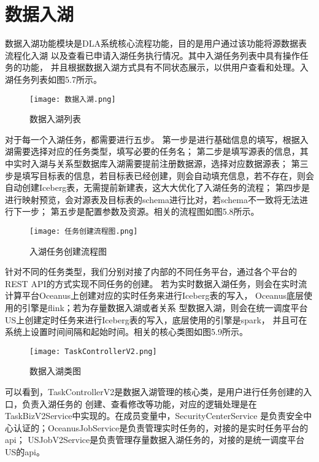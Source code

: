 \section{数据入湖}

数据入湖功能模块是DLA系统核心流程功能，目的是用户通过该功能将源数据表流程化入湖
以及查看已申请入湖任务执行情况。其中入湖任务列表中具有操作任务的功能，
并且根据数据入湖方式具有不同状态展示，以供用户查看和处理。入湖任务列表如图5.7所示。

\begin{figure}[h]
  \centering
  \texttt{[image: 数据入湖.png]}
  \caption{数据入湖列表}
  \label{fig:badge}
\end{figure}

对于每一个入湖任务，都需要进行五步。
第一步是进行基础信息的填写，根据入湖需要选择对应的任务类型，填写必要的任务名；
第二步是填写源表的信息，其中实时入湖与关系型数据库入湖需要提前注册数据源，选择对应数据源表；
第三步是填写目标表的信息，若目标表已经创建，则会自动填充信息，若不存在，则会自动创建Iceberg表，无需提前新建表，这大大优化了入湖任务的流程；
第四步是进行映射预览，会对源表及目标表的schema进行比对，若schema不一致将无法进行下一步；
第五步是配置参数及资源。相关的流程图如图5.8所示。

\begin{figure}[h]
  \centering
  \texttt{[image: 任务创建流程图.png]}
  \caption{入湖任务创建流程图}
  \label{fig:badge}
\end{figure}

针对不同的任务类型，我们分别对接了内部的不同任务平台，通过各个平台的REST API的方式实现不同任务的创建。
若为实时数据入湖任务，则会在实时流计算平台Oceanus上创建对应的实时任务来进行Iceberg表的写入，
Oceanus底层使用的引擎是flink；若为存量数据入湖或者关系
型数据入湖，则会在统一调度平台US上创建定时任务来进行Iceberg表的写入，底层使用的引擎是spark，
并且可在系统上设置时间间隔和起始时间。相关的核心类图如图5.9所示。

\begin{figure}[h]
  \centering
  \texttt{[image: TaskControllerV2.png]}
  \caption{数据入湖类图}
  \label{fig:badge}
\end{figure}

可以看到，TaskControllerV2是数据入湖管理的核心类，是用户进行任务创建的入口，负责入湖任务的
创建、查看修改等功能，对应的逻辑处理是在TaskBizV2Service中实现的。在成员变量中，SecurityCenterService
是负责安全中心认证的；OceanusJobService是负责管理实时任务的，对接的是实时任务平台的api；
USJobV2Service是负责管理存量数据入湖任务的，对接的是统一调度平台US的api。

